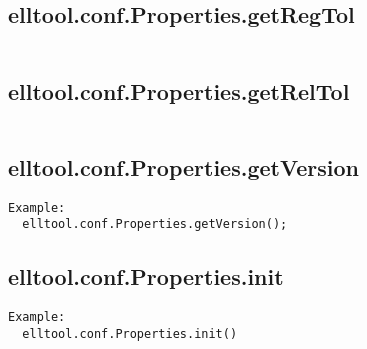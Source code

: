 \subsection{\texorpdfstring{elltool.conf.Properties.getRegTol}{getRegTol}}\label{method:elltool.conf.Properties.getRegTol}
\begin{verbatim}

\end{verbatim}
\subsection{\texorpdfstring{elltool.conf.Properties.getRelTol}{getRelTol}}\label{method:elltool.conf.Properties.getRelTol}
\begin{verbatim}

\end{verbatim}
\subsection{\texorpdfstring{elltool.conf.Properties.getVersion}{getVersion}}\label{method:elltool.conf.Properties.getVersion}
\begin{verbatim}
Example:
  elltool.conf.Properties.getVersion();
\end{verbatim}
\subsection{\texorpdfstring{elltool.conf.Properties.init}{init}}\label{method:elltool.conf.Properties.init}
\begin{verbatim}
Example:
  elltool.conf.Properties.init()
\end{verbatim}
